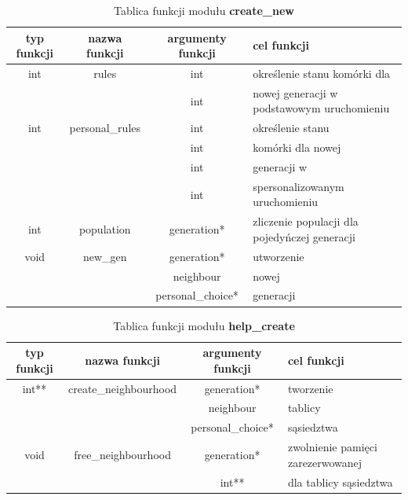 \documentclass[a4paper]{article}
\begin{document}
\newpage


\begin{table}[h!]
	\centering
	\caption{\label{table:Tabela5}Tablica funkcji modu\l{}u \textbf{create\_new}}
        \begin{tabular}{| c | c | c | p{3cm}  |}
                \hline
                typ funkcji & nazwa funkcji & argumenty funkcji & cel funkcji \\ \hline \hline

                int & rules & int & okre\'slenie stanu kom\'orki dla \\
                & & int & nowej generacji w podstawowym uruchomieniu\\ \hline

                int & personal\_rules & int & okre\'slenie stanu \\
                & & int & kom\'orki dla nowej\\
                & & int & generacji w \\
                & & int & spersonalizowanym uruchomieniu\\ \hline

                int & population & generation* & zliczenie populacji dla pojedy\'nczej generacji \\ \hline

                void & new\_gen & generation* & utworzenie \\
                & & neighbour & nowej\\
                & & personal\_choice* & generacji\\ \hline


        \end{tabular}
\end{table}




\begin{table}[h!]
	\centering
	\caption{\label{table:Tabela6}Tablica funkcji modu\l{}u \textbf{help\_create}}
        \begin{tabular}{| c | c | c | p{3cm}  |}
                \hline
                typ funkcji & nazwa funkcji & argumenty funkcji & cel funkcji \\ \hline \hline

                int** & create\_neighbourhood & generation* & tworzenie \\
                & & neighbour & tablicy \\
                & & personal\_choice* & s\k{a}siedztwa \\ \hline

                void & free\_neighbourhood & generation* & zwolnienie pami\k{e}ci zarezerwowanej \\
                & & int** & dla tablicy s\k{a}siedztwa \\ \hline

        \end{tabular}
\end{table}
\end{document}
